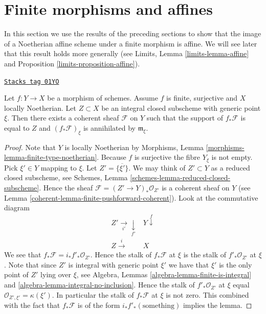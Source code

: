 \section{Finite morphisms and affines}
\label{coherent-section-finite-affine}
In this section we use the results of the preceding sections
to show that the image of a Noetherian affine scheme under a finite
morphism is affine. We will see later that this result holds more
generally (see Limits, Lemma \ref{limits-lemma-affine} and
Proposition \ref{limits-proposition-affine}).

\begin{lemma}
\label{coherent-lemma-finite-morphism-Noetherian}
\href{https://stacks.math.columbia.edu/tag/01YO}{\texttt{Stacks tag 01YO}}

Let $f : Y \to X$ be a morphism of schemes.
Assume $f$ is finite, surjective and $X$ locally Noetherian.
Let $Z \subset X$ be an integral closed subscheme with
generic point $\xi$. Then
there exists a coherent sheaf $\mathcal{F}$ on $Y$
such that the support of $f_*\mathcal{F}$ is equal to $Z$
and $(f_*\mathcal{F})_\xi$ is annihilated by $\mathfrak m_\xi$.
\end{lemma}

\begin{proof}

Note that $Y$ is locally Noetherian by
Morphisms, Lemma \ref{morphisms-lemma-finite-type-noetherian}.
Because $f$ is surjective the fibre $Y_\xi$ is not empty.
Pick $\xi' \in Y$ mapping to $\xi$. Let $Z' = \overline{\{\xi'\}}$.
We may think of $Z' \subset Y$ as a reduced closed subscheme,
see Schemes, Lemma \ref{schemes-lemma-reduced-closed-subscheme}.
Hence the sheaf $\mathcal{F} = (Z' \to Y)_*\mathcal{O}_{Z'}$
is a coherent sheaf on $Y$ (see
Lemma \ref{coherent-lemma-finite-pushforward-coherent}).
Look at the commutative diagram
$$
\begin{array}{cc}Z' \underset{i'}{\longrightarrow}\underset{f'}{\downarrow} & Y \overset{f}{\downarrow} \\ Z \overset{i}{\longrightarrow} & X\end{array}
$$
We see that $f_*\mathcal{F} = i_*f'_*\mathcal{O}_{Z'}$.
Hence the stalk of $f_*\mathcal{F}$ at $\xi$ is the stalk
of $f'_*\mathcal{O}_{Z'}$ at $\xi$. Note that since $Z'$ is
integral with generic point $\xi'$ we have that
$\xi'$ is the only point of $Z'$ lying over $\xi$, see
Algebra, Lemmas \ref{algebra-lemma-finite-is-integral} and
\ref{algebra-lemma-integral-no-inclusion}.
Hence the stalk of $f'_*\mathcal{O}_{Z'}$ at $\xi$
equal $\mathcal{O}_{Z', \xi'} = \kappa(\xi')$. In particular
the stalk of $f_*\mathcal{F}$ at $\xi$ is not zero.
This combined with the fact that $f_*\mathcal{F}$ is
of the form $i_*f'_*(\text{something})$ implies the lemma.
\end{proof}

